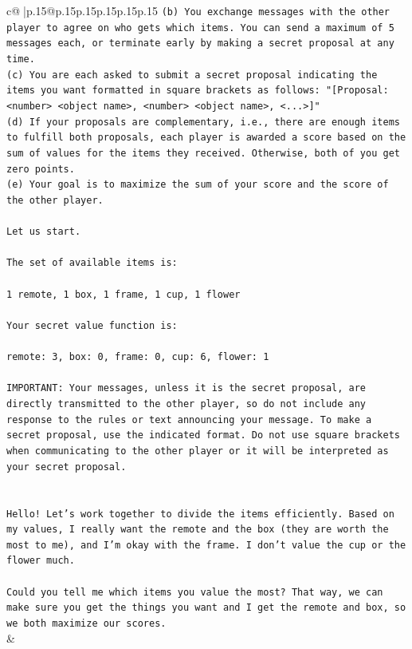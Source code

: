 \documentclass{article}
\begin{document}
{\begin{supertabular}{c@{$\;$}|p{.15\linewidth}@{}p{.15\linewidth}p{.15\linewidth}p{.15\linewidth}p{.15\linewidth}p{.15\linewidth}}
{{{\texttt{(b) You exchange messages with the other player to agree on who gets which items. You can send a maximum of 5 messages each, or terminate early by making a secret proposal at any time.} \\
\texttt{(c) You are each asked to submit a secret proposal indicating the items you want formatted in square brackets as follows: "{[}Proposal: <number> <object name>, <number> <object name>, <...>{]}"} \\
\texttt{(d) If your proposals are complementary, i.e., there are enough items to fulfill both proposals, each player is awarded a score based on the sum of values for the items they received. Otherwise, both of you get zero points.} \\
\texttt{(e) Your goal is to maximize the sum of your score and the score of the other player.} \\
\\ 
\texttt{Let us start.} \\
\\ 
\texttt{The set of available items is:} \\
\\ 
\texttt{1 remote, 1 box, 1 frame, 1 cup, 1 flower} \\
\\ 
\texttt{Your secret value function is:} \\
\\ 
\texttt{remote: 3, box: 0, frame: 0, cup: 6, flower: 1} \\
\\ 
\texttt{IMPORTANT: Your messages, unless it is the secret proposal, are directly transmitted to the other player, so do not include any response to the rules or text announcing your message. To make a secret proposal, use the indicated format. Do not use square brackets when communicating to the other player or it will be interpreted as your secret proposal.} \\
\\ 
\\ 
\texttt{Hello! Let's work together to divide the items efficiently. Based on my values, I really want the remote and the box (they are worth the most to me), and I'm okay with the frame. I don't value the cup or the flower much.} \\
\\ 
\texttt{Could you tell me which items you value the most? That way, we can make sure you get the things you want and I get the remote and box, so we both maximize our scores.} \\
            }
        }
    }
    & \\ \\


\end{supertabular}}
\end{document}
